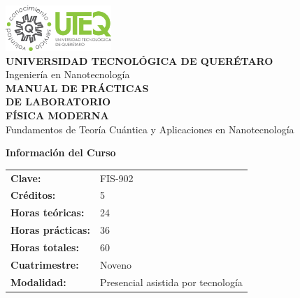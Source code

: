 \documentclass[12pt,a4paper]{book}
\begin{document}
	
	\begin{titlepage}
		\begin{center}
			
			\includegraphics[width=4cm]{../../Imagenes/Logo_uteq}\\[1cm]
			
			{\large \textcolor{uteqblue}{\textbf{UNIVERSIDAD TECNOLÓGICA DE QUERÉTARO}}}\\[0.3cm]
			{\normalsize \textcolor{uteqgray}{Ingeniería en Nanotecnología}}\\[2cm]
			
			{\Huge \textcolor{uteqblue}{\textbf{MANUAL DE PRÁCTICAS}}}\\[0.5cm]
			{\Huge \textcolor{uteqblue}{\textbf{DE LABORATORIO}}}\\[1cm]
			
			{\LARGE \textcolor{uteqgray}{\textbf{FÍSICA MODERNA}}}\\[0.3cm]
			{\large \textcolor{uteqgray}{Fundamentos de Teoría Cuántica y Aplicaciones en Nanotecnología}}\\[2cm]
			
			\begin{tcolorbox}[colback=uteqblue!10!white,colframe=uteqblue,width=12cm]
				\begin{center}
					\textbf{Información del Curso}\\[0.3cm]
					\begin{tabular}{ll}
						\textbf{Clave:} & FIS-902 \\
						\textbf{Créditos:} & 5 \\
						\textbf{Horas teóricas:} & 24 \\
						\textbf{Horas prácticas:} & 36 \\
						\textbf{Horas totales:} & 60 \\
						\textbf{Cuatrimestre:} & Noveno \\
						\textbf{Modalidad:} & Presencial asistida por tecnología \\
					\end{tabular}
				\end{center}
			\end{tcolorbox}
			

\end{center}
\end{titlepage}
\end{document}
